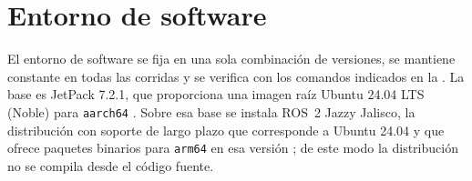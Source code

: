 \section{Entorno de software}
\label{sec:software-environment}

El entorno de software se fija en una sola combinación de versiones, se
mantiene constante en todas las corridas y se verifica con los comandos
indicados en la . La base es JetPack 7.2.1,
que proporciona una imagen raíz Ubuntu 24.04 LTS (Noble) para \texttt{aarch64}
\cite{nvidiacorporation2026jetpack}. Sobre esa base se instala ROS~2 Jazzy
Jalisco, la distribución con soporte de largo plazo que corresponde a Ubuntu
24.04 y que ofrece paquetes binarios para \texttt{arm64} en esa versión
\cite{rep2000, rosjazzydocs}; de este modo la distribución no se compila desde
el código fuente.

